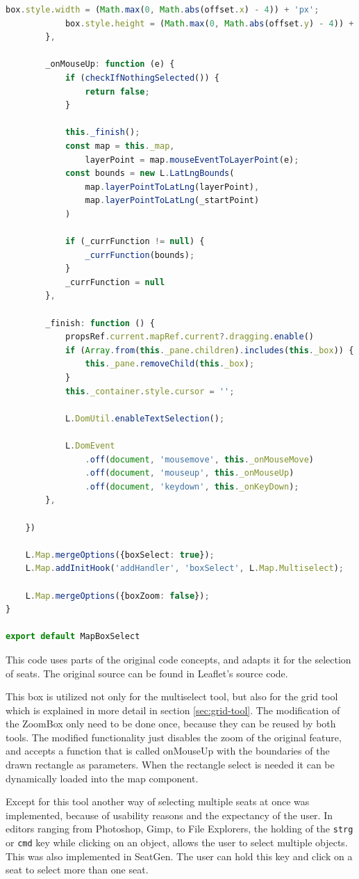\begin{lstlisting}[language=Typescript, caption={Multiselect Tool},label={lst:multiselect-tool}]
            box.style.width = (Math.max(0, Math.abs(offset.x) - 4)) + 'px';
            box.style.height = (Math.max(0, Math.abs(offset.y) - 4)) + 'px';
        },

        _onMouseUp: function (e) {
            if (checkIfNothingSelected()) {
                return false;
            }

            this._finish();
            const map = this._map,
                layerPoint = map.mouseEventToLayerPoint(e);
            const bounds = new L.LatLngBounds(
                map.layerPointToLatLng(layerPoint),
                map.layerPointToLatLng(_startPoint)
            )

            if (_currFunction != null) {
                _currFunction(bounds);
            }
            _currFunction = null
        },

        _finish: function () {
            propsRef.current.mapRef.current?.dragging.enable()
            if (Array.from(this._pane.children).includes(this._box)) {
                this._pane.removeChild(this._box);
            }
            this._container.style.cursor = '';

            L.DomUtil.enableTextSelection();

            L.DomEvent
                .off(document, 'mousemove', this._onMouseMove)
                .off(document, 'mouseup', this._onMouseUp)
                .off(document, 'keydown', this._onKeyDown);
        },

    })

    L.Map.mergeOptions({boxSelect: true});
    L.Map.addInitHook('addHandler', 'boxSelect', L.Map.Multiselect);

    L.Map.mergeOptions({boxZoom: false});
}

export default MapBoxSelect
\end{lstlisting}

This code uses parts of the original code concepts, and adapts it for the selection of seats. The original source can be found in Leaflet's source code.

This box is utilized not only for the multiselect tool, but also for the grid tool which is explained in more detail in section \ref{sec:grid-tool}. The modification of the ZoomBox only need to be done once, because they can be reused by both tools. The modified functionality just disables the zoom of the original feature, and accepts a function that is called onMouseUp with the boundaries of the drawn rectangle as parameters. When the rectangle select is needed it can be dynamically loaded into the map component.

Except for this tool another way of selecting multiple seats at once was implemented, because of usability reasons and the expectancy of the user. In editors ranging from Photoshop, Gimp, to File Explorers, the holding of the \texttt{strg} or \texttt{cmd} key while clicking on an object, allows the user to select multiple objects. This was also implemented in SeatGen. The user can hold this key and click on a seat to select more than one seat.